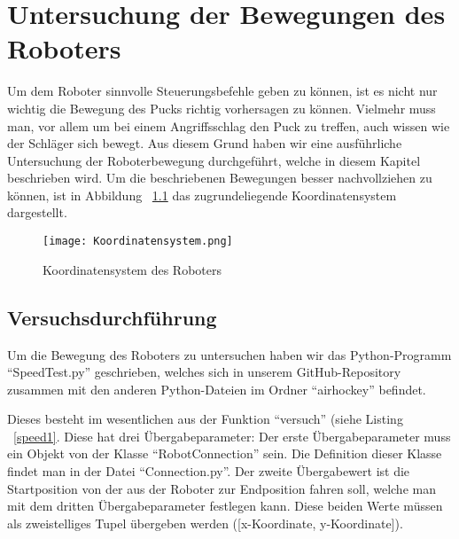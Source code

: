 
\chapter{Untersuchung der Bewegungen des Roboters}
Um dem Roboter sinnvolle Steuerungsbefehle geben zu können, ist es nicht nur wichtig die Bewegung des Pucks richtig vorhersagen zu können. Vielmehr muss man, vor allem um bei einem Angriffsschlag den Puck zu treffen, auch wissen wie der Schläger sich bewegt. Aus diesem Grund haben wir eine ausführliche Untersuchung der Roboterbewegung durchgeführt, welche in diesem Kapitel beschrieben wird. Um die beschriebenen Bewegungen besser nachvollziehen zu können, ist in Abbildung ~\ref{koordintensystem} das zugrundeliegende Koordinatensystem dargestellt. 

\begin{figure}[htbp]
\centering
\texttt{[image: Koordinatensystem.png]}
\caption{Koordinatensystem des Roboters} 
\label{koordintensystem}
\end{figure}

\section{Versuchsdurchführung}
Um die Bewegung des Roboters zu untersuchen haben wir das Python-Programm \enquote{SpeedTest.py} geschrieben, welches sich in unserem GitHub-Repository zusammen mit den anderen Python-Dateien im Ordner \enquote{airhockey} befindet. 

Dieses besteht im wesentlichen aus der Funktion \enquote{versuch} (siehe Listing ~\ref{speed1}. Diese hat drei Übergabeparameter: Der erste Übergabeparameter muss ein Objekt von der Klasse \enquote{RobotConnection} sein. Die Definition dieser Klasse findet man in der Datei \enquote{Connection.py}. Der zweite Übergabewert ist die Startposition von der aus der Roboter zur Endposition fahren soll, welche man mit dem dritten Übergabeparameter festlegen kann. Diese beiden Werte müssen als zweistelliges Tupel übergeben werden ([x-Koordinate, y-Koordinate]). 

